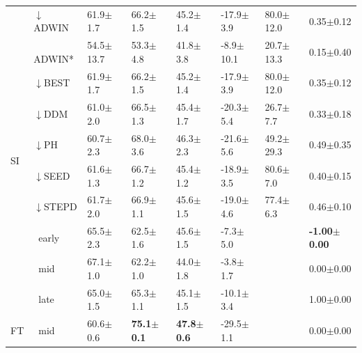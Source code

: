 \begin{tabular}{llllllll}
\midrule
\multirow[t]{10}{*}{SI} & $\downarrow$ADWIN & 61.9\tiny{$\pm$1.7} & 66.2\tiny{$\pm$1.5} & 45.2\tiny{$\pm$1.4} & -17.9\tiny{$\pm$3.9} & 80.0\tiny{$\pm$12.0} & 0.35\tiny{$\pm$0.12} \\
 & $\ \;$ADWIN* & 54.5\tiny{$\pm$13.7} & 53.3\tiny{$\pm$4.8} & 41.8\tiny{$\pm$3.8} & -8.9\tiny{$\pm$10.1} & 20.7\tiny{$\pm$13.3} & 0.15\tiny{$\pm$0.40} \\
 & $\downarrow$BEST & 61.9\tiny{$\pm$1.7} & 66.2\tiny{$\pm$1.5} & 45.2\tiny{$\pm$1.4} & -17.9\tiny{$\pm$3.9} & 80.0\tiny{$\pm$12.0} & 0.35\tiny{$\pm$0.12} \\
 & $\downarrow$DDM & 61.0\tiny{$\pm$2.0} & 66.5\tiny{$\pm$1.3} & 45.4\tiny{$\pm$1.7} & -20.3\tiny{$\pm$5.4} & 26.7\tiny{$\pm$7.7} & 0.33\tiny{$\pm$0.18} \\
 & $\downarrow$PH & 60.7\tiny{$\pm$2.3} & 68.0\tiny{$\pm$3.6} & 46.3\tiny{$\pm$2.3} & -21.6\tiny{$\pm$5.6} & 49.2\tiny{$\pm$29.3} & 0.49\tiny{$\pm$0.35} \\
 & $\downarrow$SEED & 61.6\tiny{$\pm$1.3} & 66.7\tiny{$\pm$1.2} & 45.4\tiny{$\pm$1.2} & -18.9\tiny{$\pm$3.5} & 80.6\tiny{$\pm$7.0} & 0.40\tiny{$\pm$0.15} \\
 & $\downarrow$STEPD & 61.7\tiny{$\pm$2.0} & 66.9\tiny{$\pm$1.1} & 45.6\tiny{$\pm$1.5} & -19.0\tiny{$\pm$4.6} & 77.4\tiny{$\pm$6.3} & 0.46\tiny{$\pm$0.10} \\
 & $\ \;$early & 65.5\tiny{$\pm$2.3} & 62.5\tiny{$\pm$1.6} & 45.6\tiny{$\pm$1.5} & -7.3\tiny{$\pm$5.0} &  & \textbf{-1.00\tiny{$\pm$0.00}} \\
 & $\ \;$mid & 67.1\tiny{$\pm$1.0} & 62.2\tiny{$\pm$1.0} & 44.0\tiny{$\pm$1.8} & -3.8\tiny{$\pm$1.7} &  & 0.00\tiny{$\pm$0.00} \\
 & $\ \;$late & 65.0\tiny{$\pm$1.5} & 65.3\tiny{$\pm$1.1} & 45.1\tiny{$\pm$1.5} & -10.1\tiny{$\pm$3.4} &  & 1.00\tiny{$\pm$0.00} \\
\midrule
FT & $\ \;$mid & 60.6\tiny{$\pm$0.6} & \textbf{75.1\tiny{$\pm$0.1}} & \textbf{47.8\tiny{$\pm$0.6}} & -29.5\tiny{$\pm$1.1} &  & 0.00\tiny{$\pm$0.00} \\
\bottomrule
\end{tabular}
